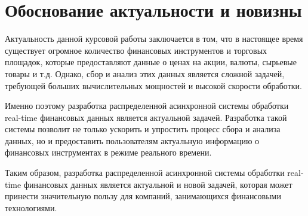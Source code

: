 \section{Обоснование актуальности и новизны}

Актуальность данной курсовой работы заключается в том, что в настоящее время существует огромное количество финансовых инструментов и торговых площадок, которые предоставляют данные о ценах на акции, валюты, сырьевые товары и т.д. Однако, сбор и анализ этих данных является сложной задачей, требующей больших вычислительных мощностей и высокой скорости обработки.

Именно поэтому разработка распределенной асинхронной системы обработки real-time финансовых данных является актуальной задачей. Разработка такой системы позволит не только ускорить и упростить процесс сбора и анализа данных, но и предоставить пользователям актуальную информацию о финансовых инструментах в режиме реального времени.

Таким образом, разработка распределенной асинхронной системы обработки real-time финансовых данных является актуальной и новой задачей, которая может принести значительную пользу для компаний, занимающихся финансовыми технологиями.